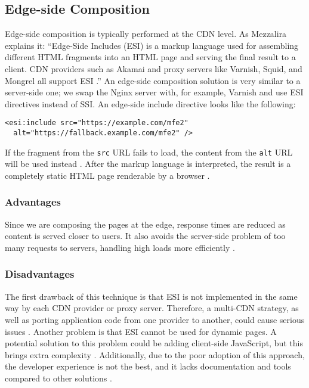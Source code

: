\subsection{Edge-side Composition}
Edge-side composition is typically performed at the CDN level. As Mezzalira \cite{MezzaliraBuildingMf} explains it: ``Edge-Side Includes (ESI) is a markup language used for assembling different HTML fragments into an HTML page and serving the final result to a client. CDN providers such as Akamai and proxy servers like Varnish, Squid, and Mongrel all support ESI \cite{Geers}.'' An edge-side composition solution is very similar to a server-side one; we swap the Nginx server with, for example, Varnish and use ESI directives instead of SSI. An edge-side include directive looks like the following:  
\begin{verbatim}
<esi:include src="https://example.com/mfe2" 
  alt="https://fallback.example.com/mfe2" />
\end{verbatim}
If the fragment from the \texttt{src} URL fails to load, the content from the \texttt{alt} URL will be used instead \cite{Geers}. After the markup language is interpreted, the result is a completely static HTML page renderable by a browser \cite{MezzaliraBuildingMf}.  

\subsubsection{Advantages}
Since we are composing the pages at the edge, response times are reduced as content is served closer to users. It also avoids the server-side problem of too many requests to servers, handling high loads more efficiently \cite{MezzaliraBuildingMf}.  

\subsubsection{Disadvantages}
The first drawback of this technique is that ESI is not implemented in the same way by each CDN provider or proxy server. Therefore, a multi-CDN strategy, as well as porting application code from one provider to another, could cause serious issues \cite{Peltonen}. Another problem is that ESI cannot be used for dynamic pages. A potential solution to this problem could be adding client-side JavaScript, but this brings extra complexity \cite{MezzaliraBuildingMf}. Additionally, due to the poor adoption of this approach, the developer experience is not the best, and it lacks documentation and tools compared to other solutions \cite{MezzaliraBuildingMf}.  

